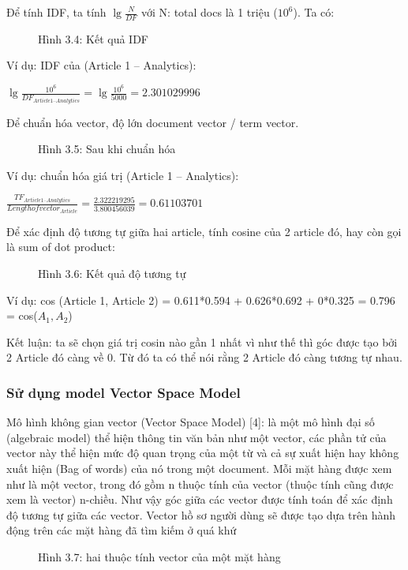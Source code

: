 \documentclass[a4paper,12pt,numbered,print,index,custombib, oneside, custommargin]{report}
\begin{document}
Để tính IDF, ta tính $\lg \frac{N}{DF}$ với N: total docs là 1 triệu ($10^6$). Ta có:
\begin{figure}[h]
\centering
\caption{Hình 3.4: Kết quả IDF}
\end{figure}
Ví dụ: IDF của (Article 1 – Analytics): \par
$\lg \frac{10^6}{DF _{Article 1 – Analytics}} = \lg \frac{10^6}{5000} = 2.301029996$ \par


Để chuẩn hóa vector, độ lớn document vector / term vector.
\begin{figure}[h]
\centering
\caption{Hình 3.5: Sau khi chuẩn hóa}
\end{figure}

Ví dụ: chuẩn hóa giá trị (Article 1 – Analytics): \par
$\frac{TF _{Article 1 – Analytics}}{Length of vector _{Article}} = \frac{2.322219295}{3.800456039} = 0.61103701$ \par

Để xác định độ tương tự giữa hai article, tính cosine của 2 article đó, hay còn gọi là sum of dot product:
\begin{figure}[h]
\centering
\caption{Hình 3.6: Kết quả độ tương tự}
\end{figure}

Ví dụ: cos (Article 1, Article 2) =	0.611*0.594 + 0.626*0.692 + 0*0.325 = 0.796 = cos($A_1, A_2$)

Kết luận: ta sẽ chọn giá trị cosin nào gần 1 nhất vì như thế thì góc được tạo bởi 2 Article đó càng về 0. Từ đó ta có thể nói rằng 2 Article đó càng tương tự nhau.
\subsubsection{Sử dụng model Vector Space Model}
Mô hình không gian vector (Vector Space Model) [4]:  là một mô hình đại số (algebraic model) thể hiện thông tin văn bản như một vector, các phần tử của vector này thể hiện mức độ quan trọng của một từ và cả sự xuất hiện hay không xuất hiện (Bag of words) của nó trong một document.
Mỗi mặt hàng được xem như là một vector, trong đó gồm n thuộc tính của vector (thuộc tính cũng được xem là vector) n-chiều. Như vậy góc giữa các vector được tính toán để xác định độ tương tự giữa các vector. 
Vector hồ sơ người dùng sẽ được tạo dựa trên hành động trên các mặt hàng đã tìm kiếm ở quá khứ
\begin{figure}[h]
\centering
\caption{Hình 3.7: hai thuộc tính vector của một mặt hàng}
\end{figure}
\end{document}
